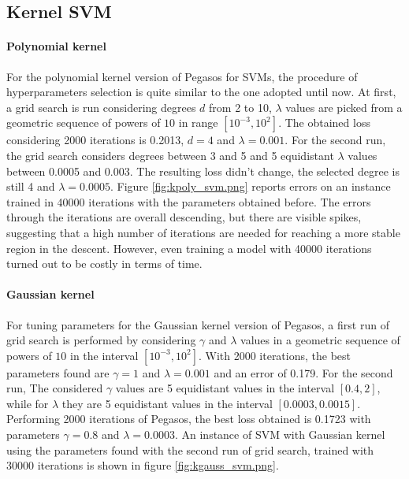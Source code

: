 \documentclass{article}
\begin{document}
\subsection{Kernel SVM}
\paragraph{Polynomial kernel}
For the polynomial kernel version of Pegasos for SVMs, the procedure of hyperparameters selection is quite similar to the one adopted until now. At first, a grid search is run considering degrees $d$ from 2 to 10, $\lambda$ values are picked from a geometric sequence of powers of $10$ in range $[10^{-3}, 10^2]$. The obtained loss considering 2000 iterations is 0.2013, $d=4$ and $\lambda=0.001$. For the second run, the grid search considers degrees between 3 and 5 and 5 equidistant $\lambda$ values between 0.0005 and 0.003. The resulting loss didn't change, the selected degree is still 4 and $\lambda=0.0005$. Figure \ref{fig:kpoly_svm.png} reports errors on an instance trained in 40000 iterations with the parameters obtained before. The errors through the iterations are overall descending, but there are visible spikes, suggesting that a high number of iterations are needed for reaching a more stable region in the descent. However, even training a model with 40000 iterations turned out to be costly in terms of time.

\paragraph{Gaussian kernel}
For tuning parameters for the Gaussian kernel version of Pegasos, a first run of grid search is performed by considering $\gamma$ and $\lambda$ values in a geometric sequence of powers of $10$ in the interval $[10^{-3}, 10^2]$. With 2000 iterations, the best parameters found are $\gamma=1$ and $\lambda=0.001$ and an error of 0.179. For the second run, The considered $\gamma$ values are 5 equidistant values in the interval $[0.4, 2]$, while for $\lambda$ they are 5 equidistant values in the interval $[0.0003, 0.0015]$. Performing 2000 iterations of Pegasos, the best loss obtained is 0.1723 with parameters $\gamma=0.8$ and $\lambda=0.0003$. An instance of SVM with Gaussian kernel using the parameters found with the second run of grid search, trained with 30000 iterations is shown in figure \ref{fig:kgauss_svm.png}.
\end{document}
